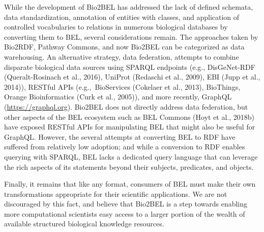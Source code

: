 While the development of Bio2BEL has addressed the lack of defined schemata, data standardization, annotation of entities with classes, and application of controlled vocabularies to relations in numerous biological databases by converting them to BEL, several considerations remain.
The approaches taken by Bio2RDF, Pathway Commons, and now Bio2BEL can be categorized as data warehousing.
An alternative strategy, data federation, attempts to combine disparate biological data sources using SPARQL endpoints (e.g., DisGeNet-RDF (Queralt-Rosinach et al., 2016), UniProt (Redaschi et al., 2009), EBI (Jupp et al., 2014)), RESTful APIs (e.g.,~BioServices (Cokelaer et al., 2013), BioThings, Orange Bioinformatics (Curk et al., 2005)), and more recently, GraphQL (\url{https://graphql.org}).
Bio2BEL does not directly address data federation, but other aspects of the BEL ecosystem such as BEL Commons (Hoyt et al., 2018b) have exposed RESTful APIs for manipulating BEL that might also be useful for GraphQL\@.
However, the several attempts at converting BEL to RDF have suffered from relatively low adoption; and while a conversion to RDF enables querying with SPARQL, BEL lacks a dedicated query language that can leverage the rich aspects of its statements beyond their subjects, predicates, and objects.

Finally, it remains that like any format, consumers of BEL must make their own transformations appropriate for their scientific applications.
We are not discouraged by this fact, and believe that Bio2BEL is a step towards enabling more computational scientists easy access to a larger portion of the wealth of available structured biological knowledge resources.
